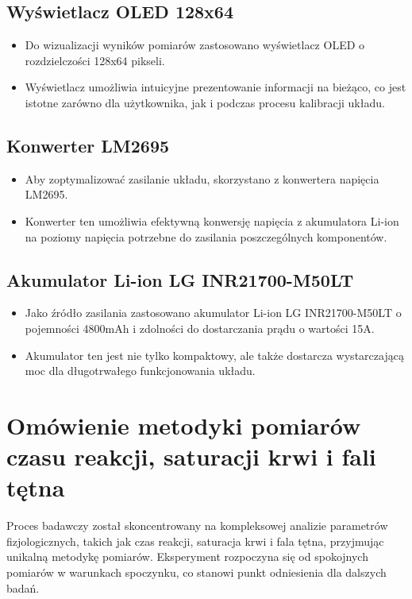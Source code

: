 \subsection{Wyświetlacz OLED 128x64}
\begin{itemize}
    \item Do wizualizacji wyników pomiarów zastosowano wyświetlacz OLED o rozdzielczości 128x64 pikseli.
    \item Wyświetlacz umożliwia intuicyjne prezentowanie informacji na bieżąco, co jest istotne zarówno dla użytkownika, jak i podczas procesu kalibracji układu.
\end{itemize}
\subsection{Konwerter LM2695}
\begin{itemize}
    \item Aby zoptymalizować zasilanie układu, skorzystano z konwertera napięcia LM2695.
    \item Konwerter ten umożliwia efektywną konwersję napięcia z akumulatora Li-ion na poziomy napięcia potrzebne do zasilania poszczególnych komponentów.
\end{itemize}
\subsection{Akumulator Li-ion LG INR21700-M50LT}
\begin{itemize}
    \item Jako źródło zasilania zastosowano akumulator Li-ion LG INR21700-M50LT o pojemności 4800mAh i zdolności do dostarczania prądu o wartości 15A.
    \item Akumulator ten jest nie tylko kompaktowy, ale także dostarcza wystarczającą moc dla długotrwałego funkcjonowania układu.
\end{itemize}
\section{Omówienie metodyki pomiarów czasu reakcji, saturacji krwi i fali tętna}
Proces badawczy został skoncentrowany na kompleksowej analizie parametrów fizjologicznych, takich jak czas reakcji, saturacja krwi i fala tętna, przyjmując unikalną metodykę pomiarów. Eksperyment rozpoczyna się od spokojnych pomiarów w warunkach spoczynku, co stanowi punkt odniesienia dla dalszych badań.

